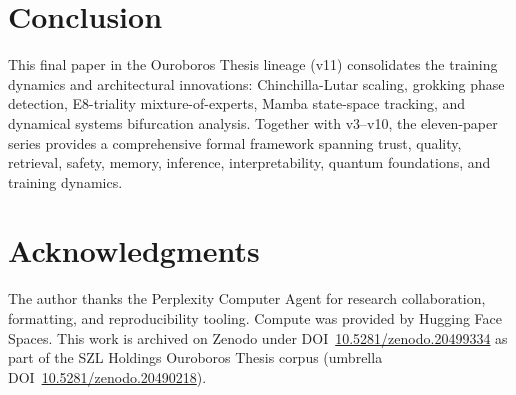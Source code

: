 \documentclass[11pt]{article}
\theoremstyle{plain}
\begin{document}
\section{Conclusion}

This final paper in the Ouroboros Thesis lineage (v11) consolidates the training dynamics and architectural innovations: Chinchilla-Lutar scaling, grokking phase detection, E8-triality mixture-of-experts, Mamba state-space tracking, and dynamical systems bifurcation analysis. Together with v3–v10, the eleven-paper series provides a comprehensive formal framework spanning trust, quality, retrieval, safety, memory, inference, interpretability, quantum foundations, and training dynamics.




\section*{Acknowledgments}
The author thanks the Perplexity Computer Agent for research collaboration, formatting, and
reproducibility tooling. Compute was provided by Hugging Face Spaces. This work is archived on
Zenodo under DOI~\href{https://doi.org/10.5281/zenodo.20499334}{10.5281/zenodo.20499334} as part of the SZL Holdings Ouroboros Thesis
corpus (umbrella DOI~\href{https://doi.org/10.5281/zenodo.20490218}{10.5281/zenodo.20490218}).

\nocite{08ref1,08ref2,08ref3,08ref4,08ref5,08ref6,08ref7,08ref8,08ref9}


\end{document}
